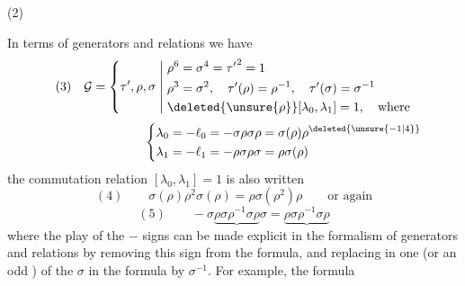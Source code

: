 \begin{samepage}
(2)\quad
{}
\end{samepage}

In terms of generators and relations we have
\[
(3)\quad\mathcal{G}=\left\{\tau',\rho,\sigma\;\middle|\;
\begin{aligned}
&\rho^6=\sigma^4={\tau'}^2=1\\
&\rho^3=\sigma^2,\quad\tau'(\rho)=\rho^{-1},\quad\tau'(\sigma)=\sigma^{-1}\\
&\deleted{\unsure{\rho}}[\lambda_0,\lambda_1]=1,\quad\text{where}
\end{aligned}\right.
\]
\[
\hspace{8em}\left\{
\begin{aligned}
\lambda_0&=-\ell_0=-\sigma\rho\sigma\rho=\sigma(\rho)\rho^{\deleted{\unsure{-1|4}}}\\
\lambda_1&=-\ell_1=-\rho\sigma\rho\sigma=\rho\sigma(\rho)
\end{aligned}\right.
\]
 the commutation relation $[\lambda_0,\lambda_1]=1$ is also written
\[
(4)\qquad \sigma(\rho)\rho^2\sigma(\rho)=\rho\sigma(\rho^2)\rho
\qquad\text{or again}
\]
\[
(5)\qquad -\sigma\underbrace{\rho\sigma\rho^{-1}\sigma\rho}\sigma
=\underbrace{\rho\sigma\rho^{-1}\sigma\rho}
\]
where the play of the $-$ signs can be made explicit in the formalism of generators and relations by removing this sign from the formula, and replacing in  one (or an odd ) of the $\sigma$ in the formula by $\sigma^{-1}$. For example, the formula

